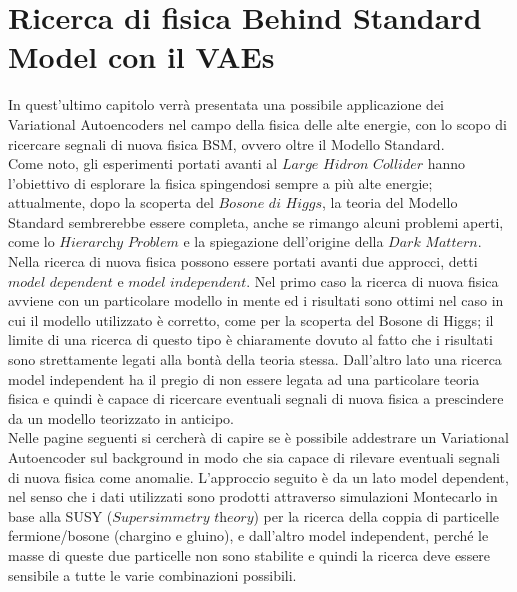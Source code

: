 \section{Ricerca di fisica Behind Standard Model con il VAEs}
\label{fisica_BSM_VAEs}

In quest'ultimo capitolo verrà presentata una possibile applicazione dei Variational Autoencoders nel campo della fisica delle alte energie, con lo scopo di ricercare segnali di nuova fisica BSM, ovvero oltre il Modello Standard. \\
Come noto, gli esperimenti portati avanti al $\textit{Large Hidron Collider}$ hanno l'obiettivo di esplorare la fisica spingendosi sempre a più alte energie; attualmente, dopo la scoperta del $\textit{Bosone di Higgs}$, la teoria del Modello Standard sembrerebbe essere completa, anche se rimango alcuni problemi aperti, come lo $\textit{Hierarchy Problem}$ e la spiegazione dell'origine della $\textit{Dark Mattern}$. \\
Nella ricerca di nuova fisica possono essere portati avanti due approcci, detti $\textit{model dependent}$ e $\textit{model independent}$. Nel primo caso la ricerca di nuova fisica avviene con un particolare modello in mente ed i risultati sono ottimi nel caso in cui il modello utilizzato è corretto, come per la scoperta del Bosone di Higgs; il limite di una ricerca di questo tipo è chiaramente dovuto al fatto che i risultati sono strettamente legati alla bontà della teoria stessa. Dall'altro lato una ricerca model independent ha il pregio di non essere legata ad una particolare teoria fisica e quindi è capace di ricercare eventuali segnali di nuova fisica a prescindere da un modello teorizzato in anticipo.\\
Nelle pagine seguenti si cercherà di capire se è possibile addestrare un Variational Autoencoder sul background in modo che sia capace di rilevare eventuali segnali di nuova fisica come anomalie. L'approccio seguito è da un lato model dependent, nel senso che i dati utilizzati sono prodotti attraverso simulazioni Montecarlo in base alla SUSY ($\textit{Supersimmetry theory}$) per la ricerca della coppia di particelle fermione/bosone (chargino e gluino), e dall'altro model independent, perché le masse di queste due particelle non sono stabilite e quindi la ricerca deve essere sensibile a tutte le varie combinazioni possibili.
\newpage

